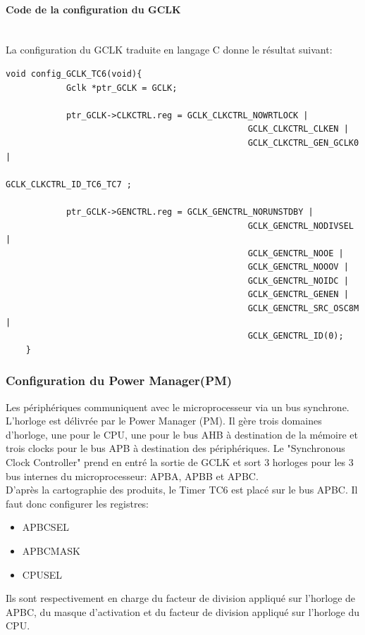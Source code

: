 \documentclass[a4paper]{article}
\begin{document}
	\paragraph{Code de la configuration du GCLK} ~~\\
	La configuration du GCLK traduite en langage C donne le résultat suivant:
	\begin{lstlisting}[style=CStyle]
    void config_GCLK_TC6(void){
	        Gclk *ptr_GCLK = GCLK;
	
	        ptr_GCLK->CLKCTRL.reg = GCLK_CLKCTRL_NOWRTLOCK |
							                    GCLK_CLKCTRL_CLKEN |
							                    GCLK_CLKCTRL_GEN_GCLK0 |
							                    GCLK_CLKCTRL_ID_TC6_TC7 ;
	
	        ptr_GCLK->GENCTRL.reg = GCLK_GENCTRL_NORUNSTDBY |
							                    GCLK_GENCTRL_NODIVSEL |
							                    GCLK_GENCTRL_NOOE |
							                    GCLK_GENCTRL_NOOOV |
							                    GCLK_GENCTRL_NOIDC |
							                    GCLK_GENCTRL_GENEN |
							                    GCLK_GENCTRL_SRC_OSC8M |
						        	            GCLK_GENCTRL_ID(0);
    }
	\end{lstlisting}
	
	\subsubsection{Configuration du Power Manager(PM)} 
	Les périphériques communiquent avec le microprocesseur via un bus synchrone. L'horloge est délivrée par le Power Manager (PM).
	Il gère trois domaines d'horloge, une pour le CPU, une pour le bus AHB à destination de la mémoire et trois clocks pour le bus APB à destination des périphériques.
	Le "Synchronous Clock Controller" prend en entré la sortie de GCLK et sort 3 horloges pour les 3 bus internes du microprocesseur: APBA, APBB et APBC.\\
	D'après la cartographie des produits, le Timer TC6 est placé sur le bus APBC. Il faut donc configurer les registres:
	\begin{itemize}
		\item {APBCSEL}
		\item {APBCMASK}
		\item {CPUSEL}
	\end{itemize}
Ils sont respectivement en charge du facteur de division appliqué sur l'horloge de APBC, du masque d'activation et du facteur de division appliqué sur l'horloge du CPU.
\end{document}
